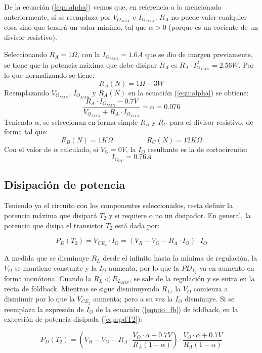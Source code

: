 De la ecuaci\'on (\ref{eqn:alpha}) vemos que, en referencia a lo mencionado anteriormente, si se reemplaza por $V_{O_{MAX}}$ e $I_{O_{MAX}}$, $R_A$ no puede valer cualquier cosa sino que tendr\'a un valor m\'inimo, tal que $\alpha > 0$ (porque es un cociente de un divisor resistivo).\par
Seleccionando $R_A = 1\Omega$, con la $I_{O_{MAX}} = 1.6A$ que se dio de margen previamente, se tiene que la potencia m\'axima que debe disipar $R_A$ es $R_A \cdot I^2_{O_{MAX}} = 2.56W$. Por lo que normalizando se tiene:
\[
R_A(N) = 1\Omega - 3W
\]
Reemplazando $V_{O_{MAX}}$, $I_{O_{MAX}}$ y $R_A(N)$ en la ecuaci\'on (\ref{eqn:alpha}) se obtiene:
\[
\frac{R_A \cdot I_{O_{MAX}}- 0.7V}{V_{O_{MAX}} + R_A \cdot I_{O_{MAX}}} = \alpha = 0.076
\]
Teniendo $\alpha$, se seleccionan en forma simple $R_B$ y $R_C$ para el divisor resistivo, de forma tal que:
\[
R_B(N) = 1K\Omega \hspace{2cm} R_C(N) = 12K\Omega
\]
Con el valor de $\alpha$ calculado, si $V_O = 0V$, la $I_O$ resultante es la de cortocircuito:
\[
I_{O_{CC}} = 0.76A
\]

\subsection{Disipaci\'on de potencia}

Teniendo ya el circuito con los componentes seleccionados, resta definir la potencia m\'axima que disipar\'a $T_2$ y si requiere o no un disipador. 
En general, la potencia que disipa el transistor $T_2$ est\'a dada por:

\begin{equation}
P_D(T_2) = V_{CE_2} \cdot I_O = (V_R - V_O - R_A \cdot I_O) \cdot I_O
\label{eqn:pdT2}
\end{equation}

A medida que se disminuye $R_L$ desde el infinito hasta la m\'inima de regulaci\'on, la $V_O$ se mantiene constante y la $I_O$ aumenta, por lo que la $PD_{T_2}$ va en aumento en forma mon\'otona. Cuando la $R_L < R_{L_{MIN}}$, se sale de la regulaci\'on y se entra en la recta de foldback. Mientras se sigue disminuyendo $R_L$, la $V_O$ comienza a disminuir por lo que la $V_{CE_2}$ aumenta; pero a su vez la $I_O$ disminuye. Si se reemplaza la expresi\'on de $I_O$ de la ecuaci\'on (\ref{eqn:io_fb}) de foldback, en la expresi\'on de potencia disipada (\ref{eqn:pdT2}):

\[
P_D(T_2) = \left( V_R - V_O - R_A \cdot \frac{V_O \cdot \alpha + 0.7V}{R_A(1-\alpha)}\right) \cdot \frac{V_O \cdot \alpha + 0.7V}{R_A(1-\alpha)}
\]  


